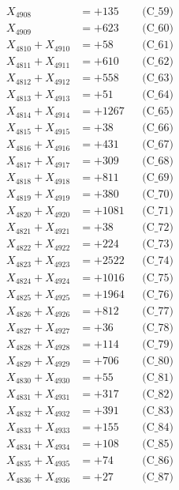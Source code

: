\documentclass[a4paper,10pt]{article}
\begin{document}
{\begin{align}
X_{4908} &= +135 && \text{(C\_59)} \\
X_{4909} &= +623 && \text{(C\_60)} \\
\allowbreak
X_{4810} + X_{4910} &= +58 && \text{(C\_61)} \\
X_{4811} + X_{4911} &= +610 && \text{(C\_62)} \\
X_{4812} + X_{4912} &= +558 && \text{(C\_63)} \\
X_{4813} + X_{4913} &= +51 && \text{(C\_64)} \\
X_{4814} + X_{4914} &= +1267 && \text{(C\_65)} \\
\allowbreak
X_{4815} + X_{4915} &= +38 && \text{(C\_66)} \\
X_{4816} + X_{4916} &= +431 && \text{(C\_67)} \\
X_{4817} + X_{4917} &= +309 && \text{(C\_68)} \\
X_{4818} + X_{4918} &= +811 && \text{(C\_69)} \\
X_{4819} + X_{4919} &= +380 && \text{(C\_70)} \\
\allowbreak
X_{4820} + X_{4920} &= +1081 && \text{(C\_71)} \\
X_{4821} + X_{4921} &= +38 && \text{(C\_72)} \\
X_{4822} + X_{4922} &= +224 && \text{(C\_73)} \\
X_{4823} + X_{4923} &= +2522 && \text{(C\_74)} \\
X_{4824} + X_{4924} &= +1016 && \text{(C\_75)} \\
\allowbreak
X_{4825} + X_{4925} &= +1964 && \text{(C\_76)} \\
X_{4826} + X_{4926} &= +812 && \text{(C\_77)} \\
X_{4827} + X_{4927} &= +36 && \text{(C\_78)} \\
X_{4828} + X_{4928} &= +114 && \text{(C\_79)} \\
X_{4829} + X_{4929} &= +706 && \text{(C\_80)} \\
\allowbreak
X_{4830} + X_{4930} &= +55 && \text{(C\_81)} \\
X_{4831} + X_{4931} &= +317 && \text{(C\_82)} \\
X_{4832} + X_{4932} &= +391 && \text{(C\_83)} \\
X_{4833} + X_{4933} &= +155 && \text{(C\_84)} \\
X_{4834} + X_{4934} &= +108 && \text{(C\_85)} \\
\allowbreak
X_{4835} + X_{4935} &= +74 && \text{(C\_86)} \\
X_{4836} + X_{4936} &= +27 && \text{(C\_87)} \\

\end{align}}
\end{document}
